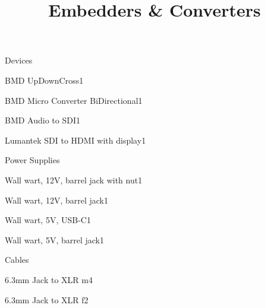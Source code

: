 \def\papersize{5}




\title{Embedders \& Converters}

\begin{checklist}{Devices}
  \item{BMD UpDownCross}{1}
  \item{BMD Micro Converter BiDirectional}{1}
  \item{BMD Audio to SDI}{1}
  \item{Lumantek SDI to HDMI with display}{1}
\end{checklist}

\begin{checklist}{Power Supplies}
  \item{Wall wart, 12V, barrel jack with nut}{1}
  \item{Wall wart, 12V, barrel jack}{1}
  \item{Wall wart, 5V, USB-C}{1}
  \item{Wall wart, 5V, barrel jack}{1}
\end{checklist}

\begin{checklist}{Cables}
  \item{6.3mm Jack to XLR m}{4}
  \item{6.3mm Jack to XLR f}{2}
\end{checklist}


